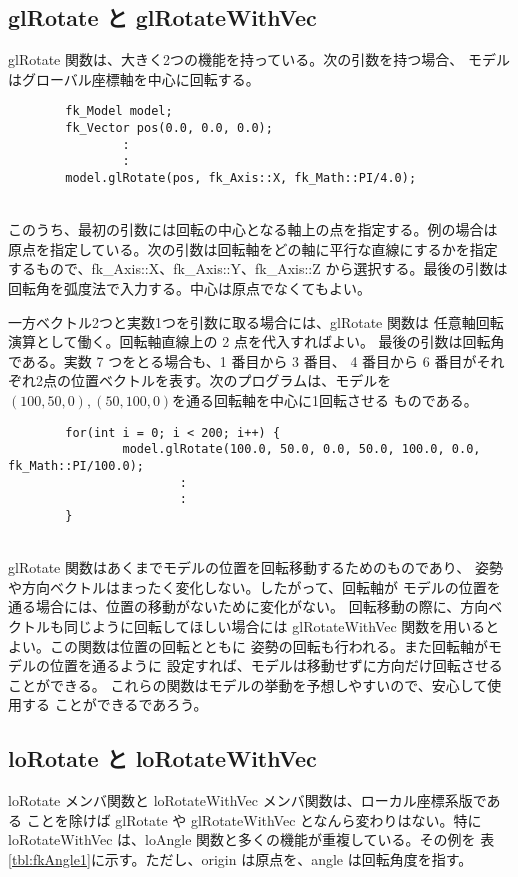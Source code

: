 \subsection{glRotate と glRotateWithVec}
glRotate 関数は、大きく2つの機能を持っている。次の引数を持つ場合、
モデルはグローバル座標軸を中心に回転する。
\\
\begin{breakbox}
\begin{verbatim}
        fk_Model model;
        fk_Vector pos(0.0, 0.0, 0.0);
                :
                :
        model.glRotate(pos, fk_Axis::X, fk_Math::PI/4.0);
\end{verbatim}
\end{breakbox}
~ \\
このうち、最初の引数には回転の中心となる軸上の点を指定する。例の場合は
原点を指定している。次の引数は回転軸をどの軸に平行な直線にするかを指定
するもので、fk\_Axis::X、fk\_Axis::Y、fk\_Axis::Z から選択する。最後の引数は
回転角を弧度法で入力する。中心は原点でなくてもよい。

一方ベクトル2つと実数1つを引数に取る場合には、glRotate 関数は
任意軸回転演算として働く。回転軸直線上の 2 点を代入すればよい。
最後の引数は回転角である。実数 7 つをとる場合も、1 番目から 3 番目、
4 番目から 6 番目がそれぞれ2点の位置ベクトルを表す。次のプログラムは、モデルを
\((100, 50, 0), (50, 100, 0)\)を通る回転軸を中心に1回転させる
ものである。
\\
\begin{breakbox}
\begin{verbatim}
        for(int i = 0; i < 200; i++) {
                model.glRotate(100.0, 50.0, 0.0, 50.0, 100.0, 0.0, fk_Math::PI/100.0);
                        :
                        :
        }
\end{verbatim}
\end{breakbox}
~ \\
glRotate 関数はあくまでモデルの位置を回転移動するためのものであり、
姿勢や方向ベクトルはまったく変化しない。したがって、回転軸が
モデルの位置を通る場合には、位置の移動がないために変化がない。
回転移動の際に、方向ベクトルも同じように回転してほしい場合には
glRotateWithVec 関数を用いるとよい。この関数は位置の回転とともに
姿勢の回転も行われる。また回転軸がモデルの位置を通るように
設定すれば、モデルは移動せずに方向だけ回転させることができる。
これらの関数はモデルの挙動を予想しやすいので、安心して使用する
ことができるであろう。
\subsection{loRotate と loRotateWithVec}
loRotate メンバ関数と loRotateWithVec メンバ関数は、ローカル座標系版である
ことを除けば glRotate や glRotateWithVec となんら変わりはない。特に
loRotateWithVec は、loAngle 関数と多くの機能が重複している。その例を
表\ref{tbl:fkAngle1}に示す。ただし、origin は原点を、angle は回転角度を指す。

